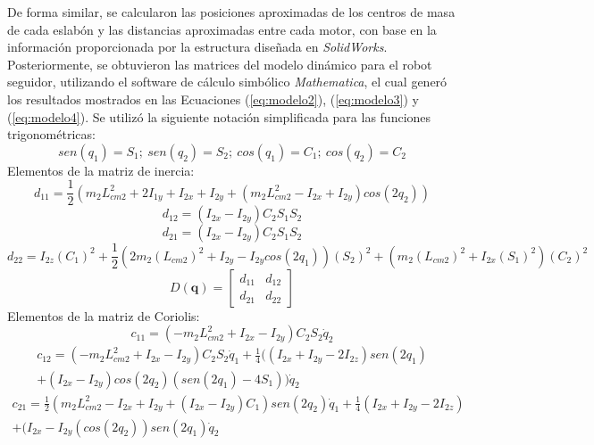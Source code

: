 De forma similar, se calcularon las posiciones aproximadas de los centros de masa de cada eslabón y las distancias aproximadas entre cada motor, con base en la información proporcionada por la estructura diseñada en \textit{SolidWorks}. Posteriormente, se obtuvieron las matrices del modelo dinámico para el robot seguidor, utilizando el software de cálculo simbólico \textit{Mathematica}, el cual generó los resultados mostrados en las Ecuaciones (\ref{eq:modelo2}), (\ref{eq:modelo3}) y (\ref{eq:modelo4}). Se utilizó la siguiente notación simplificada para las funciones trigonométricas:
\begin{equation}
    sen(q_1)=S_1;\ sen(q_2)=S_2;\ cos(q_1)=C_1;\ cos(q_2)=C_2
\end{equation}
Elementos de la matriz de inercia:
\begin{equation}
    d_{11}= \frac{1}{2} \left(m_2 L_{cm2}^2+2I_{1y}+I_{2x}+I_{2y}+(m_2 L_{cm2}^2-I_{2x}+I_{2y})cos(2q_2)\right)
\end{equation}
\begin{equation}
    d_{12}=(I_{2x}-I_{2y})C_2 S_1 S_2
\end{equation}
\begin{equation}
    d_{21}=(I_{2x}-I_{2y})C_2 S_1 S_2
\end{equation}
\begin{equation}
    d_{22}=I_{2z} (C_1)^2+ \frac{1}{2}\left(2m_2 (L_{cm2})^2+I_{2y}-I_{2y}cos(2q_1)\right) (S_2)^2+\left(m_2 (L_{cm2})^2+I_{2x} (S_1)^2 \right)(C_2)^2
\end{equation}
\begin{equation} \label{eq:modelo2}
    D(\textbf{q})=
    \begin{bmatrix}
        d_{11} & d_{12} \\
        d_{21} & d_{22} 
    \end{bmatrix}
\end{equation}
Elementos de la matriz de Coriolis:
\begin{equation}
    c_{11}=(-m_2 L_{cm2}^2+I_{2x}-I_{2y} ) C_2 S_2 \Dot{q}_2
\end{equation}
\begin{multline*}
    c_{12}=(-m_2 L_{cm2}^2+I_{2x}-I_{2y} ) C_2 S_2 \Dot{q}_1 +\frac{1}{4} ((I_{2x}+I_{2y}-2I_{2z} )sen(2q_1 )\\
    +(I_{2x}-I_{2y} )cos(2q_2 )(sen(2q_1 )-4S_1 ))\Dot{q}_2
\end{multline*}
\begin{multline*}
    c_{21}= \frac{1}{2}(m_2 L_{cm2}^2-I_{2x}+I_{2y}+(I_{2x}-I_{2y}) C_1 )sen(2q_2) \Dot{q}_1 +\frac{1}{4}(I_{2x}+I_{2y}-2I_{2z})\\
    +(I_{2x}-I_{2y}(cos(2q_2 ) )sen(2q_1)\Dot{q}_2
\end{multline*}
